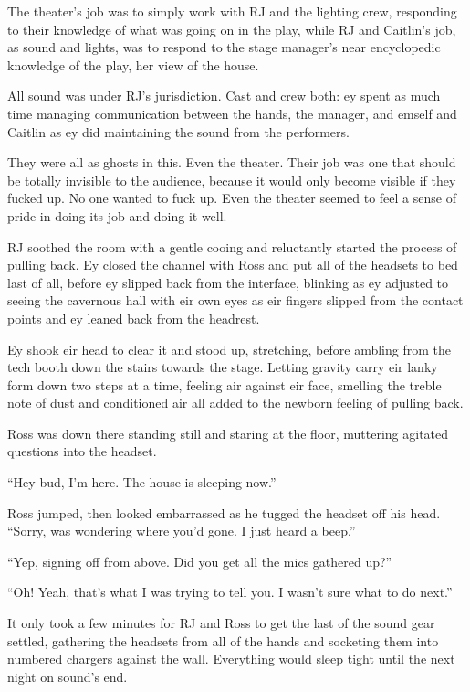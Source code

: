 The theater's job was to simply work with RJ and the lighting crew, responding to their knowledge of what was going on in the play, while RJ and Caitlin's job, as sound and lights, was to respond to the stage manager's near encyclopedic knowledge of the play, her view of the house.

All sound was under RJ's jurisdiction. Cast and crew both: ey spent as much time managing communication between the hands, the manager, and emself and Caitlin as ey did maintaining the sound from the performers.

They were all as ghosts in this. Even the theater. Their job was one that should be totally invisible to the audience, because it would only become visible if they fucked up. No one wanted to fuck up. Even the theater seemed to feel a sense of pride in doing its job and doing it well.

RJ soothed the room with a gentle cooing and reluctantly started the process of pulling back. Ey closed the channel with Ross and put all of the headsets to bed last of all, before ey slipped back from the interface, blinking as ey adjusted to seeing the cavernous hall with eir own eyes as eir fingers slipped from the contact points and ey leaned back from the headrest.

Ey shook eir head to clear it and stood up, stretching, before ambling from the tech booth down the stairs towards the stage. Letting gravity carry eir lanky form down two steps at a time, feeling air against eir face, smelling the treble note of dust and conditioned air all added to the newborn feeling of pulling back.

Ross was down there standing still and staring at the floor, muttering agitated questions into the headset.

``Hey bud, I'm here. The house is sleeping now.''

Ross jumped, then looked embarrassed as he tugged the headset off his head. ``Sorry, was wondering where you'd gone. I just heard a beep.''

``Yep, signing off from above. Did you get all the mics gathered up?''

``Oh! Yeah, that's what I was trying to tell you. I wasn't sure what to do next.''

It only took a few minutes for RJ and Ross to get the last of the sound gear settled, gathering the headsets from all of the hands and socketing them into numbered chargers against the wall. Everything would sleep tight until the next night on sound's end.

